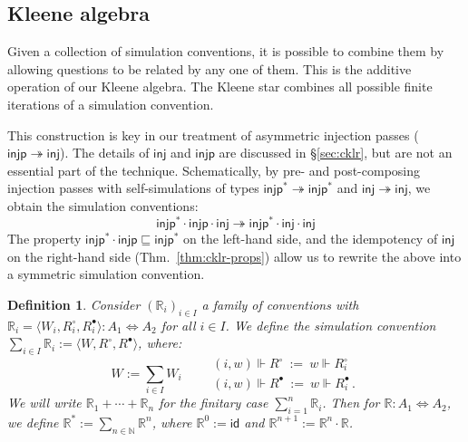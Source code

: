 \documentclass[draft,11pt]{report}
\newtheorem{definition}{Definition}
\newcommand{\kw}[1]{\ensuremath{ \mathsf{#1} }}
\newcommand{\que}{\circ}         %
\newcommand{\ans}{\bullet}       %
\newcommand{\scref}{\sqsubseteq} %
\begin{document}
\subsection{Kleene algebra} %

Given a collection of simulation conventions,
it is possible to combine them
by allowing questions to be related by any one of them.
This is the additive operation of our Kleene algebra.
The Kleene star combines all possible finite iterations
of a simulation convention.

This construction is key in our treatment of
asymmetric injection passes
($\kw{injp} \twoheadrightarrow \kw{inj}$).
The details of $\kw{inj}$ and $\kw{injp}$
are discussed in \S\ref{sec:cklr},
but are not an essential part of the technique.
Schematically,
by pre- and post-composing injection passes
with self-simulations of types
$\kw{injp}^* \twoheadrightarrow \kw{injp}^*$ and
$\kw{inj} \twoheadrightarrow \kw{inj}$,
we obtain the simulation conventions:
\[
  \kw{injp}^* \cdot \kw{injp} \cdot \kw{inj}
  \twoheadrightarrow
  \kw{injp}^* \cdot \kw{inj} \cdot \kw{inj}
\]
The property $\kw{injp}^* \cdot \kw{injp} \scref \kw{injp}^*$
on the left-hand side,
and the idempotency of $\kw{inj}$
on the right-hand side (Thm.~\ref{thm:cklr-props})
allow us to rewrite the above into
a symmetric simulation convention.

\begin{definition} \label{def:joins} %
Consider $(\mathbb{R}_i)_{i \in I}$
a family of conventions
with
$\mathbb{R}_i = \langle W_i, R_i^\que, R_i^\ans \rangle
  : A_1 \Leftrightarrow A_2$
for all $i \in I$.
We define the simulation convention
$\sum_{i \in I} \mathbb{R}_i := \langle W, R^\que, R^\ans \rangle$,
where:
\[
  W := \sum_{i \in I} W_i  \qquad
  \begin{array}{l}
  (i, w) \Vdash R^\que \: := \: w \Vdash R_i^\que \\[1ex]
  (i, w) \Vdash R^\ans \: := \: w \Vdash R_i^\ans \,.
  \end{array}
\]
We will write $\mathbb{R}_1 + \cdots + \mathbb{R}_n$
for the finitary case $\sum_{i=1}^n \mathbb{R}_i$.
Then for $\mathbb{R} : A_1 \Leftrightarrow A_2$,
we define
$\mathbb{R}^* := \sum_{n \in \mathbb{N}} \mathbb{R}^n$,
where
$\mathbb{R}^0 := \kw{id}$ and
$\mathbb{R}^{n+1} := \mathbb{R}^n \cdot \mathbb{R}$.
\end{definition}
\end{document}
